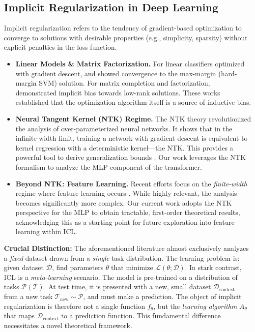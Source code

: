 \subsection{Implicit Regularization in Deep Learning}
\label{subsec:implicit-reg}

Implicit regularization refers to the tendency of gradient-based optimization to converge to solutions with desirable properties (e.g., simplicity, sparsity) without explicit penalties in the loss function.

\begin{itemize}
	\item \textbf{Linear Models \& Matrix Factorization.} For linear classifiers optimized with gradient descent, \citet{soudry2018implicit} and \citet{ji2020gradient} showed convergence to the max-margin (hard-margin SVM) solution. For matrix completion and factorization, \citet{gunasekar2017implicit, gunasekar2018characterizing} demonstrated implicit bias towards low-rank solutions. These works established that the optimization algorithm itself is a source of inductive bias.
	\item \textbf{Neural Tangent Kernel (NTK) Regime.} The NTK theory \citep{jacot2018neural, arora2019exact} revolutionized the analysis of over-parameterized neural networks. It shows that in the infinite-width limit, training a network with gradient descent is equivalent to kernel regression with a deterministic kernel—the NTK. This provides a powerful tool to derive generalization bounds \citep{cao2019generalization}. Our work leverages the NTK formalism to analyze the MLP component of the transformer.
	\item \textbf{Beyond NTK: Feature Learning.} Recent efforts focus on the \textit{finite-width} regime where feature learning occurs \citep{woodworth2020kernel, yang2021tensor}. While highly relevant, the analysis becomes significantly more complex. Our current work adopts the NTK perspective for the MLP to obtain tractable, first-order theoretical results, acknowledging this as a starting point for future exploration into feature learning within ICL.
\end{itemize}

\textbf{Crucial Distinction:} The aforementioned literature almost exclusively analyzes a \textit{fixed} dataset drawn from a \textit{single} task distribution. The learning problem is: given dataset $\mathcal{D}$, find parameters $\theta$ that minimize $\mathcal{L}(\theta; \mathcal{D})$. In stark contrast, ICL is a \textit{meta-learning} scenario. The model is pre-trained on a distribution of tasks $\mathcal{P}(\mathcal{T})$. At test time, it is presented with a new, small dataset $\mathcal{D}_{\text{context}}$ from a new task $\mathcal{T}_{\text{new}} \sim \mathcal{P}$, and must make a prediction. The object of implicit regularization is therefore not a single function $f_\theta$, but the \textit{learning algorithm} $A_\theta$ that maps $\mathcal{D}_{\text{context}}$ to a prediction function. This fundamental difference necessitates a novel theoretical framework.

